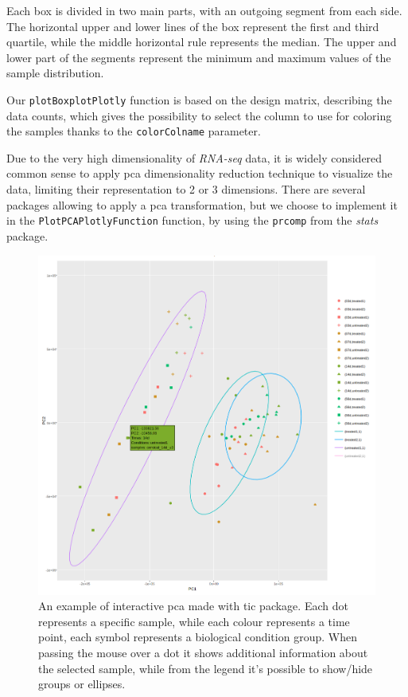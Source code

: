 Each box is divided in two main parts, with an outgoing segment from each side. 
The horizontal upper and lower lines of the box represent the first and third quartile, while the middle horizontal rule represents the median.
The upper and lower part of the segments represent the minimum and maximum values of the sample distribution.

Our \lstinline!plotBoxplotPlotly! function is based on the design matrix, describing the data counts, which gives the possibility to select the column to use for coloring the samples thanks to the \lstinline!colorColname! parameter. 

Due to the very high dimensionality of \textit{RNA-seq} data, it is widely considered common sense to apply \gls{pca} dimensionality reduction technique to visualize the data, limiting their representation to 2 or 3 dimensions.
There are several packages allowing to apply a \gls{pca} transformation, but we choose to implement it in the \lstinline!PlotPCAPlotlyFunction! function, by using the \lstinline!prcomp! from the \textit{stats} package.


\begin{figure}[H]
\centering
\includegraphics[width=\textwidth, keepaspectratio]{img/ticorser/pca_example.png}
\caption[ticorser pca]{An example of interactive \gls{pca} made with \gls{tic} package. Each dot represents a specific sample, while each colour represents a time point, each symbol represents a biological condition group. When passing the mouse over a dot it shows additional information about the selected sample, while from the legend it's possible to show/hide groups or ellipses.}
\label{fig:ticorserpca}

\end{figure}


